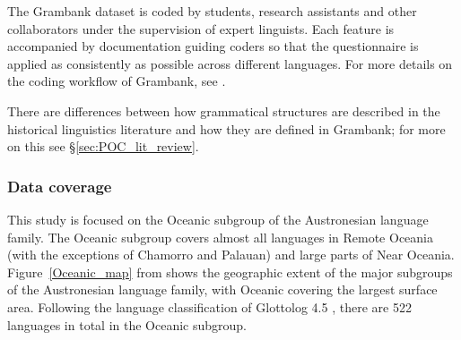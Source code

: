 \documentclass[12pt,letterpaper]{article}
\begin{document}
The Grambank dataset is coded by students, research assistants and other collaborators under the supervision of expert linguists. Each feature is accompanied by documentation guiding coders so that the questionnaire is applied as consistently as possible across different languages. For more details on the coding workflow of Grambank, see \citet{slingerland2020coding}. %

There are differences between how grammatical structures are described in the historical linguistics literature and how they are defined in Grambank; for more on this see §\ref{sec:POC_lit_review}.


\FloatBarrier
\subsubsection{Data coverage} 
This study is focused on the Oceanic subgroup of the Austronesian language family. The Oceanic subgroup covers almost all languages in Remote Oceania (with the exceptions of Chamorro and Palauan) and large parts of Near Oceania. Figure~\ref{Oceanic_map} from \citet[2]{protooceanicvol5} shows the geographic extent of the major subgroups of the Austronesian language family, with Oceanic covering the largest surface area. Following the language classification of Glottolog 4.5 \citep{glottolog4_5}, there are 522 languages in total in the Oceanic subgroup.
\end{document}
